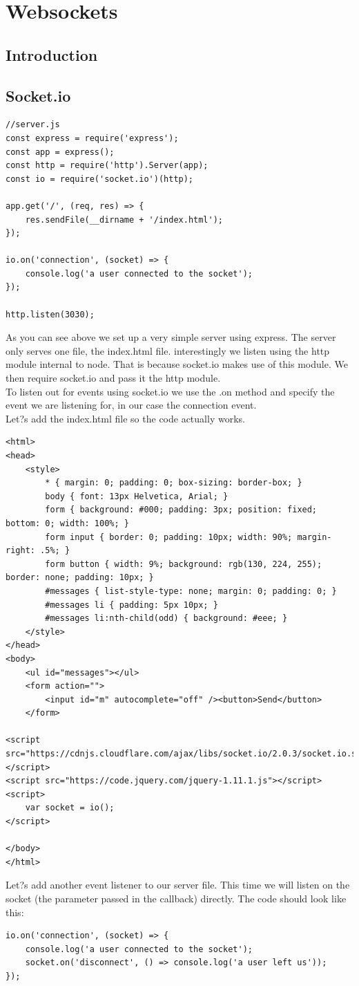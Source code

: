 \documentclass[a4paper]{article}
\begin{document}
\section{Websockets}
\subsection{Introduction}
\subsection{Socket.io}
\begin{lstlisting}
//server.js
const express = require('express');
const app = express();
const http = require('http').Server(app);
const io = require('socket.io')(http);

app.get('/', (req, res) => {
    res.sendFile(__dirname + '/index.html');
});

io.on('connection', (socket) => {
    console.log('a user connected to the socket');
});

http.listen(3030);
\end{lstlisting}
As you can see above we set up a very simple server using express. The server only serves one file, the index.html file. interestingly we listen using the http module internal to node. That is because socket.io makes use of this module. We then require socket.io and pass it the http module.\\

To listen out for events using socket.io we use the .on method and specify the event we are listening for, in our case the connection event.\\

Let?s add the index.html file so the code actually works.
\begin{lstlisting}
<html>
<head>
    <style>
        * { margin: 0; padding: 0; box-sizing: border-box; }
        body { font: 13px Helvetica, Arial; }
        form { background: #000; padding: 3px; position: fixed; bottom: 0; width: 100%; }
        form input { border: 0; padding: 10px; width: 90%; margin-right: .5%; }
        form button { width: 9%; background: rgb(130, 224, 255); border: none; padding: 10px; }
        #messages { list-style-type: none; margin: 0; padding: 0; }
        #messages li { padding: 5px 10px; }
        #messages li:nth-child(odd) { background: #eee; }
    </style>
</head>
<body>
    <ul id="messages"></ul>
    <form action="">
        <input id="m" autocomplete="off" /><button>Send</button>
    </form>

<script src="https://cdnjs.cloudflare.com/ajax/libs/socket.io/2.0.3/socket.io.slim.js"></script>
<script src="https://code.jquery.com/jquery-1.11.1.js"></script>
<script>
    var socket = io();
</script>

</body>
</html>
\end{lstlisting}
Let?s add another event listener to our server file. This time we will listen on the socket (the parameter passed in the callback) directly. The code should look like this:
\begin{lstlisting}
io.on('connection', (socket) => {
    console.log('a user connected to the socket');
    socket.on('disconnect', () => console.log('a user left us'));
});
\end{lstlisting}
\end{document}

